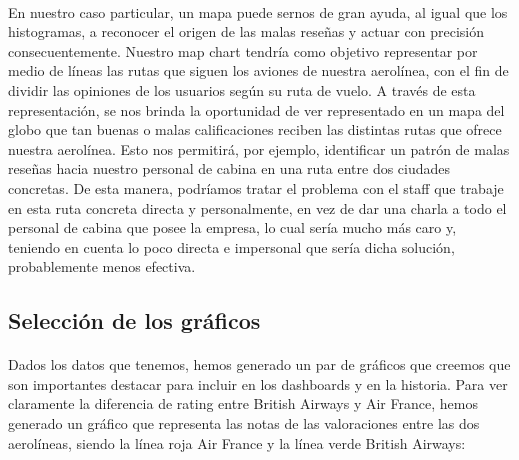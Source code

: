 \documentclass{report}
\begin{document}
                \paragraph*{}{En nuestro caso particular, un mapa puede sernos de gran ayuda, al igual que los histogramas, a reconocer el origen de las malas reseñas y actuar con precisión consecuentemente. Nuestro map chart tendría como objetivo representar por medio de líneas las rutas que siguen los aviones de nuestra aerolínea, con el fin de dividir las opiniones de los usuarios según su ruta de vuelo. A través de esta representación, se nos brinda la oportunidad de ver representado en un mapa del globo que tan buenas o malas calificaciones reciben las distintas rutas que ofrece nuestra aerolínea. Esto nos permitirá, por ejemplo, identificar un patrón de malas reseñas hacia nuestro personal de cabina en una ruta entre dos ciudades concretas. De esta manera, podríamos tratar el problema con el staff que trabaje en esta ruta concreta directa y personalmente, en vez de dar una charla a todo el personal de cabina que posee la empresa, lo cual sería mucho más caro y, teniendo en cuenta lo poco directa e impersonal que sería dicha solución, probablemente menos efectiva.}
            \subsection{Selección de los gráficos} 
            \paragraph*{}{
            Dados los datos que tenemos, hemos generado un par de gráficos que creemos que son importantes destacar para incluir en los dashboards y en la historia. Para ver claramente la diferencia de rating entre British Airways y Air France, hemos generado un gráfico que representa las notas de las valoraciones entre las dos aerolíneas, siendo la línea roja Air France y la línea verde British Airways:
            }
\end{document}
